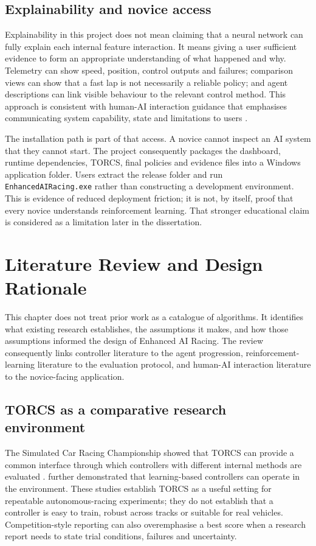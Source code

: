 \subsection{Explainability and novice access}

Explainability in this project does not mean claiming that a neural network can fully explain each internal feature interaction. It means giving a user sufficient evidence to form an appropriate understanding of what happened and why. Telemetry can show speed, position, control outputs and failures; comparison views can show that a fast lap is not necessarily a reliable policy; and agent descriptions can link visible behaviour to the relevant control method. This approach is consistent with human-AI interaction guidance that emphasises communicating system capability, state and limitations to users \parencite{amershi2019}.

The installation path is part of that access. A novice cannot inspect an AI system that they cannot start. The project consequently packages the dashboard, runtime dependencies, TORCS, final policies and evidence files into a Windows application folder. Users extract the release folder and run \texttt{EnhancedAIRacing.exe} rather than constructing a development environment. This is evidence of reduced deployment friction; it is not, by itself, proof that every novice understands reinforcement learning. That stronger educational claim is considered as a limitation later in the dissertation.

\section{Literature Review and Design Rationale}
\label{ch:literature-review}

This chapter does not treat prior work as a catalogue of algorithms. It identifies what existing research establishes, the assumptions it makes, and how those assumptions informed the design of Enhanced AI Racing. The review consequently links controller literature to the agent progression, reinforcement-learning literature to the evaluation protocol, and human-AI interaction literature to the novice-facing application.

\subsection{TORCS as a comparative research environment}

The Simulated Car Racing Championship showed that TORCS can provide a common interface through which controllers with different internal methods are evaluated \parencite{loiacono2010}. \textcite{cardamone2010} further demonstrated that learning-based controllers can operate in the environment. These studies establish TORCS as a useful setting for repeatable autonomous-racing experiments; they do not establish that a controller is easy to train, robust across tracks or suitable for real vehicles. Competition-style reporting can also overemphasise a best score when a research report needs to state trial conditions, failures and uncertainty.

